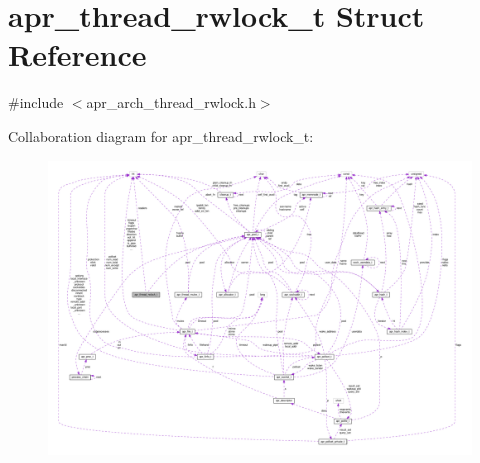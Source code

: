 \hypertarget{structapr__thread__rwlock__t}{}\section{apr\+\_\+thread\+\_\+rwlock\+\_\+t Struct Reference}
\label{structapr__thread__rwlock__t}


{\ttfamily \#include $<$apr\+\_\+arch\+\_\+thread\+\_\+rwlock.\+h$>$}



Collaboration diagram for apr\+\_\+thread\+\_\+rwlock\+\_\+t\+:
\nopagebreak
\begin{figure}[H]
\begin{center}
\leavevmode
\includegraphics[width=350pt]{structapr__thread__rwlock__t__coll__graph}
\end{center}
\end{figure}
